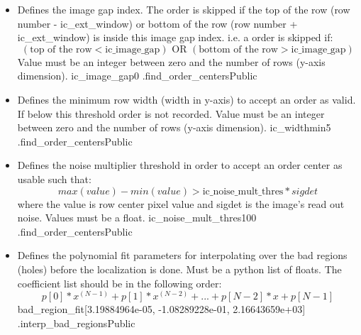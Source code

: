 \begin{itemize}
\item {}
{Defines the image gap index. The order is skipped if the top of the row (row number - ic\_ext\_window) or bottom of the row (row number + ic\_ext\_window) is inside this image gap index. i.e. a order is skipped if:
\begin{equation}
(\text{top of the row} < \text{ic\_image\_gap})
\text{ OR } 
(\text{bottom of the row} > \text{ic\_image\_gap})
\end{equation}
Value must be an integer between zero and the number of rows (y-axis dimension).
}
{ic\_image\_gap}{0}
{\callocRAW}{\constantsfile}
{\spirouLOCOR.find\_order\_centers}{Public}


\item {}
{Defines the minimum row width (width in y-axis) to accept an order as valid. If below this threshold order is not recorded. Value must be an integer between zero and the number of rows (y-axis dimension).}
{ic\_widthmin}{5}
{\callocRAW}{\constantsfile}
{\spirouLOCOR.find\_order\_centers}{Public}


\item {}
{Defines the noise multiplier threshold in order to accept an order center as usable such that:
\begin{equation}
max(value) - min(value) > \text{ic\_noise\_mult\_thres} * sigdet
\end{equation}
where the value is row center pixel value and sigdet is the image's read out noise. Values must be a float.}
{ic\_noise\_mult\_thres}{100}
{\callocRAW}{\constantsfile}
{\spirouLOCOR.find\_order\_centers}{Public}


\item {}
{Defines the polynomial fit parameters for interpolating over the bad regions (holes) before the localization is done. Must be a python list of floats. The coefficient list should be in the following order:
\begin{equation}
p[0]*x^{(N-1)} + p[1]*x^{(N-2)} + \text{...} + p[N-2]*x + p[N-1]
\end{equation}
}
{bad\_region\_fit}{[3.19884964e-05,  -1.08289228e-01,   2.16643659e+03]}
{\callocRAW}{\constantsfile}
{\spirouImage.interp\_bad\_regions}{Public}


\end{itemize}
